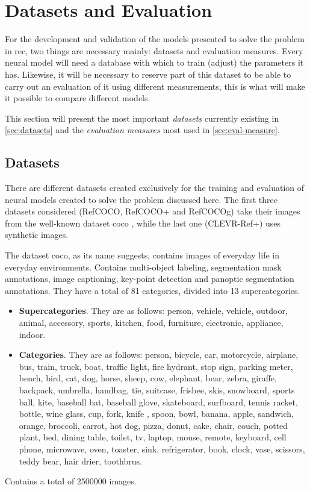 \section{Datasets and Evaluation} \label{sec:data-eval}

For the development and validation of the models presented to solve the problem
in \gls{rec}, two things are necessary mainly: datasets and evaluation
measures. Every neural model will need a database with which to train (adjust)
the parameters it has. Likewise, it will be necessary to reserve part of this
dataset to be able to carry out an evaluation of it using different
measurements, this is what will make it possible to compare different models.

This section will present the most important \emph{datasets} currently existing
in \vref{sec:datasets} and the \emph{evaluation measures} most used in
\vref{sec:eval-measure}.

\subsection{Datasets} \label{sec:datasets}

There are different datasets created exclusively for the training and
evaluation of neural models created to solve the problem discussed here. The
first three datasets considered (RefCOCO, RefCOCO+ and RefCOCOg) take their
images from the well-known dataset \gls{coco} \cite{lin14:micros}
, while the last one (CLEVR-Ref+) uses synthetic
images.

The dataset \gls{coco}, as its name suggests, contains images of everyday life
in everyday environments. Contains multi-object labeling, segmentation mask
annotations, image captioning, key-point detection and panoptic segmentation
annotations. They have a total of 81 categories, divided into 13
supercategories.
\begin{itemize}
  \item \textbf{Supercategories}. They are as follows: person, vehicle,
  vehicle, outdoor, animal, accessory, sports, kitchen, food, furniture,
  electronic, appliance, indoor.
  \item \textbf{Categories}. They are as follows: person, bicycle, car,
  motorcycle, airplane, bus, train, truck, boat, traffic light, fire hydrant,
  stop sign, parking meter, bench, bird, cat, dog, horse, sheep, cow, elephant,
  bear, zebra, giraffe, backpack, umbrella, handbag, tie, suitcase, frisbee,
  skis, snowboard, sports ball, kite, baseball bat, baseball glove, skateboard,
  surfboard, tennis racket, bottle, wine glass, cup, fork, knife , spoon, bowl,
  banana, apple, sandwich, orange, broccoli, carrot, hot dog, pizza, donut,
  cake, chair, couch, potted plant, bed, dining table, toilet, tv, laptop,
  mouse, remote, keyboard, cell phone, microwave, oven, toaster, sink,
  refrigerator, book, clock, vase, scissors, teddy bear, hair drier, toothbrus.
\end{itemize}
Contains a total of \num{2500000} images.

